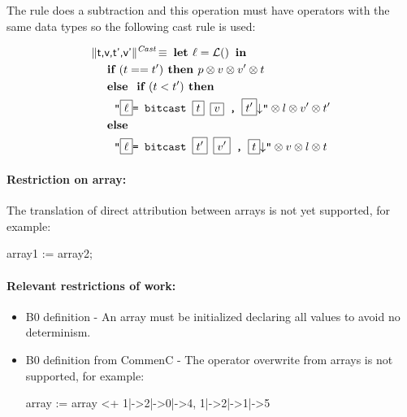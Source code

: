 The  rule does a subtraction and this operation must have operators with the same data types so the following cast rule is used:

\begin{align*}
&\trad{t,v,t',v'}{Cast} \isdef \LET  \ell = \lbl \IN \\
&\quad \IF ( t == t') \THEN p \sep v \sep v' \sep t  \\
&\quad \ELSE \IF (t<t') \THEN \\
&\quad \quad \llvm{"\PH{\ell}= bitcast \PH{t} \PH{v} , \PH{t'}\nl"}  \sep l \sep v' \sep t'\\ 
&\quad \ELSE \\ 
&\quad \quad \llvm{"\PH{\ell}= bitcast \PH{t'} \PH{v'} , \PH{t}\nl"} \sep v \sep l \sep t \\ 
\end{align*}

\paragraph{Restriction on array:} The translation of direct attribution
 between arrays is not yet supported, for example:

\begin{pascalcode}
 array1 := array2;
\end{pascalcode}


\paragraph{Relevant restrictions of work:}
\begin{itemize}
\item  B0 definition - An array must be initialized declaring all values 
to avoid no determinism.
\item B0 definition from CommenC - The operator overwrite from arrays is not supported, for example:

\begin{pascalcode}
array := array <+ {1|->2|->0|->4,  1|->2|->1|->5}
\end{pascalcode}

\end{itemize}


